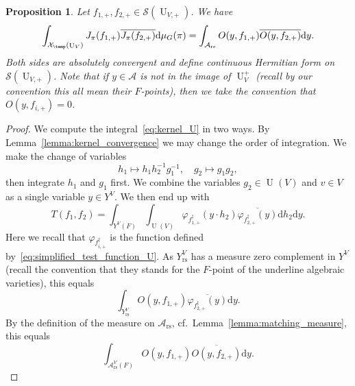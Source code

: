 \documentclass[letterpaper,11pt]{amsart}
\newcommand{\cA}{\mathcal{A}}
\newcommand{\cS}{\mathcal{S}}
\newcommand{\cX}{\mathcal{X}}
\newcommand{\rd}{\mathrm{d}}
\newcommand{\<}{\negthickspace}
\DeclareMathOperator{\U}{U}
\DeclareMathOperator{\rs}{rs}
\theoremstyle{definition}
\theoremstyle{plain}
\newtheorem{prop}[definition]{Proposition}
\theoremstyle{remark}
\numberwithin{equation}{section}
\begin{document}
\begin{prop}    \label{prop:lrtf_u}
Let $f_{1, +}, f_{2, +} \in \cS(\U_{V, +})$. We have
    \[
    \int_{\cX_{\temp}(\U_V)} J_{\pi}(f_{1, +})
    \overline{J_{\pi}(f_{2, +})} \rd \mu_G(\pi) =
    \int_{\cA_{\rs}} O(y, f_{1, +})
    \overline{O(y, f_{2, +})} \rd y.
    \]
Both sides are absolutely convergent and define continuous Hermitian form on
$\cS(\U_{V, +})$. Note that if $y \in \cA$ is not in the image of $\U_{V}^+$
(recall by our convention this all mean their $F$-points), then we take the
convention that $O(y, f_{i, +}) = 0$.
\end{prop}

\begin{proof}
We compute the integral~\eqref{eq:kernel_U} in two ways. By
Lemma~\ref{lemma:kernel_convergence} we may change the order of integration.
We make the change of variables
    \[
    h_1 \mapsto h_1 h_2^{-1} g_1^{-1}, \quad g_2 \mapsto g_1 g_2,
    \]
then integrate $h_1$ and $g_1$ first. We combine the variables $g_2 \in
\U(V)$ and $v \in V$ as a single variable $y \in Y^V$. We then end up with
    \[
    T(f_1, f_2) =
    \int_{Y^V(F)} \int_{\U(V)}  \varphi_{f_{1, +}^\ddag}(y \cdot h_2)
    \overline{\varphi_{f_{2, +}^\ddag}(y)}
    \rd h_2 \rd y.
    \]
Here we recall that $\varphi_{f_{i, +}^\ddag}$ is the function defined
by~\eqref{eq:simplified_test_function_U}. As $Y^V_{\rs}$ has a measure zero
complement in $Y^V$ (recall the convention that they stands for the $F$-point
of the underline algebraic varieties), this equals
    \[
    \int_{Y^V_{\rs}} O(y, f_{1, +})
    \overline{\varphi_{f_{2, +}^\ddag}(y)} \rd y.
    \]
By the definition of the measure on $\cA_{\rs}$, cf.~Lemma~\ref{lemma:matching_measure}, this equals
    \[
    \int_{\cA^V_{\rs}(F)} O(y, f_{1, +})
    \overline{O(y, f_{2, +})} \rd y.
    \]


\end{proof}
\end{document}
